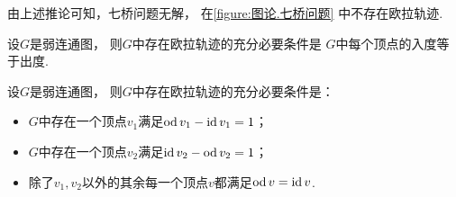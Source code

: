 由上述推论可知，七桥问题无解，
在\cref{figure:图论.七桥问题} 中不存在欧拉轨迹.

\begin{theorem}
设\(G\)是弱连通图，
则\(G\)中存在欧拉轨迹的充分必要条件是
\(G\)中每个顶点的入度等于出度.
\end{theorem}

\begin{theorem}
设\(G\)是弱连通图，
则\(G\)中存在欧拉轨迹的充分必要条件是：\begin{itemize}
	\item \(G\)中存在一个顶点\(v_1\)满足\(\operatorname{od} v_1 - \operatorname{id} v_1 = 1\)；
	\item \(G\)中存在一个顶点\(v_2\)满足\(\operatorname{id} v_2 - \operatorname{od} v_2 = 1\)；
	\item 除了\(v_1,v_2\)以外的其余每一个顶点\(v\)都满足\(\operatorname{od} v = \operatorname{id} v\).
\end{itemize}
\end{theorem}

